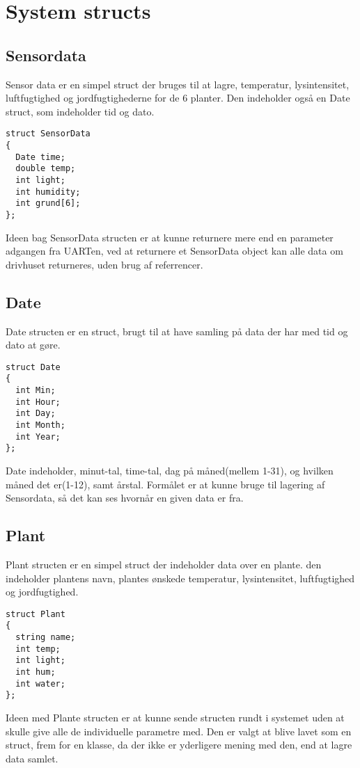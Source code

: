 \section{System structs} \label{sec:system_structs}

\subsection{Sensordata} \label{sec:sensordata}

Sensor data er en simpel struct der bruges til at lagre, temperatur, lysintensitet, luftfugtighed og jordfugtighederne for de 6 planter. Den indeholder også en Date struct, som indeholder tid og dato.

\begin{lstlisting}[caption=Sensordata-structen., label=lst:Sensordata_struct]
struct SensorData
{
  Date time;
  double temp;
  int light;
  int humidity;
  int grund[6];
};
\end{lstlisting}

Ideen bag SensorData structen er at kunne returnere mere end en parameter adgangen fra UARTen, ved at returnere et SensorData object kan alle data om drivhuset returneres, uden brug af referrencer.

\subsection{Date} \label{sec:Date}

Date structen er en struct, brugt til at have samling på data der har med tid og dato at gøre.
\begin{lstlisting}[caption=Date-structen., label=lst:Date_struct]
struct Date
{
  int Min;
  int Hour;
  int Day;
  int Month;
  int Year;
};
\end{lstlisting}

Date indeholder, minut-tal, time-tal, dag på måned(mellem 1-31), og hvilken måned det er(1-12), samt årstal. Formålet er at kunne bruge til lagering af Sensordata, så det kan ses hvornår en given data er fra.

\subsection{Plant} \label{sec:Plant}

Plant structen er en simpel struct der indeholder data over en plante. den indeholder plantens navn, plantes ønskede temperatur, lysintensitet, luftfugtighed og jordfugtighed.
\begin{lstlisting}[caption=Plant-struct., label=lst:plant_struct]
struct Plant
{
  string name;
  int temp;
  int light;
  int hum;
  int water;
};
\end{lstlisting}

Ideen med Plante structen er at kunne sende structen rundt i systemet uden at skulle give alle de individuelle parametre med. 
Den er valgt at blive lavet som en struct, frem for en klasse, da der ikke er yderligere mening med den, end at lagre data samlet.